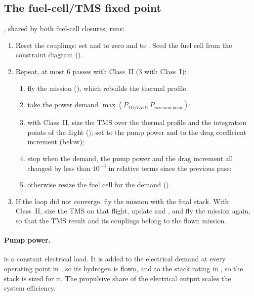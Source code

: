 \documentclass[a4paper,11pt]{article}
\begin{document}
\subsection{The fuel-cell/TMS fixed point}
, shared by both fuel-cell closures, runs:
\begin{enumerate}
\item Reset the couplings: set  and 
  to zero and  to . Seed the fuel cell from the constraint diagram
  ().
\item Repeat, at most 6 passes with Class~II (3 with Class~I):
  \begin{enumerate}
  \item fly the mission (), which rebuilds the thermal profile;
  \item take the power demand $\max(P_{TO/OEI}, P_{mission\ peak})$;
  \item with Class~II, size the TMS over the thermal profile and the integration points of
    the flight (); set
     to the pump power and  to the drag
    coefficient increment (below);
  \item stop when the demand, the pump power and the drag increment all changed by less
    than $10^{-3}$ in relative terms since the previous pass;
  \item otherwise resize the fuel cell for the demand
    ().
  \end{enumerate}
\item If the loop did not converge, fly the mission with the final stack. With Class~II,
  size the TMS on that flight, update  and , and fly the
  mission again, so that the TMS result and its couplings belong to the flown mission.
\end{enumerate}

\paragraph{Pump power.}  is a constant electrical load. It is added
to the electrical demand at every operating point in , so its hydrogen is
flown, and to the stack rating in , so the stack is sized for it. The
propulsive share of the electrical output scales the system efficiency.
\end{document}
